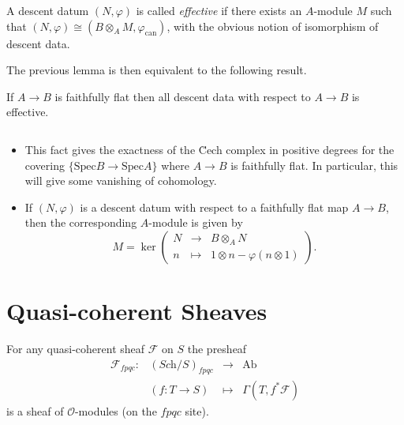 \begin{definition}
A descent datum $(N,\varphi)$ is called \emph{effective} if there exists an 
$A$-module $M$ such that $(N,\varphi) \cong (B\otimes_A M, 
\varphi_\text{can})$, with the obvious notion of isomorphism of descent data.
\end{definition}

\noindent
The previous lemma is then equivalent to the following result.

\begin{theorem}
If $A \to B$ is faithfully flat then all descent data with respect to $A\to B$ 
is effective. 
\end{theorem}

\begin{remark}$ $
\begin{itemize}
\item
This fact gives the exactness of the \u Cech complex in positive degrees for 
the covering $\{ \text{Spec} B \to \text{Spec} A\}$ where $A \to B$ is 
faithfully flat. In particular, this will give some vanishing of cohomology.
\item
If $(N,\varphi)$ is a descent datum with respect to a faithfully flat map $A\to 
B$, then the corresponding $A$-module is given by 
$$
M = \ker \left(
\begin{array}{rcl}
N & \longrightarrow & B\otimes_A N \\
 n & \longmapsto & 1 \otimes n - \varphi(n\otimes 1)
 \end{array}
\right).
$$ 
\end{itemize}
\end{remark}

\section{Quasi-coherent Sheaves}
\label{section-quasi-coherent}

\begin{proposition}
For any quasi-coherent sheaf $\mathcal{F}$ on $S$ the presheaf
$$
\begin{array}{rccl}
\mathcal{F}_{fpqc} : & (\textit{Sch}/S)_{fpqc} & \to & \text{Ab}\\ 
& (f: T \to S) &\mapsto & \Gamma(T, f^*\mathcal{F})
\end{array}
$$
  is a sheaf of $\mathcal{O}$-modules (on the $fpqc$ site). 
\end{proposition}

